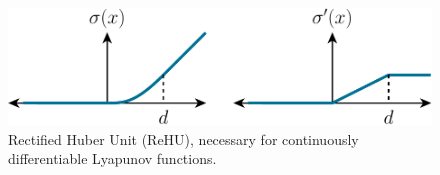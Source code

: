 \begin{figure}
    \centering
    \includegraphics[width=.66\textwidth]{LSDDM/figures/rehu.pdf}
    \caption{Rectified Huber Unit (ReHU), necessary for continuously differentiable Lyapunov functions. }
    \label{fig:rehu}
\end{figure}
